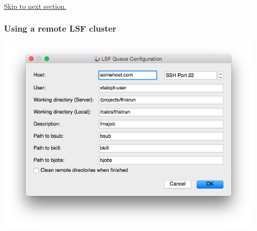 \hyperlink{tut-xo_files}{Skip to next section.}\hypertarget{tut-xo_remotelsf}{}\subsubsection{Using a remote L\+S\+F cluster}\label{tut-xo_remotelsf}
 
\begin{DoxyImageNoCaption}
  \mbox{\includegraphics[width=\textwidth]{opt-set-lsf.png}}
\end{DoxyImageNoCaption}



